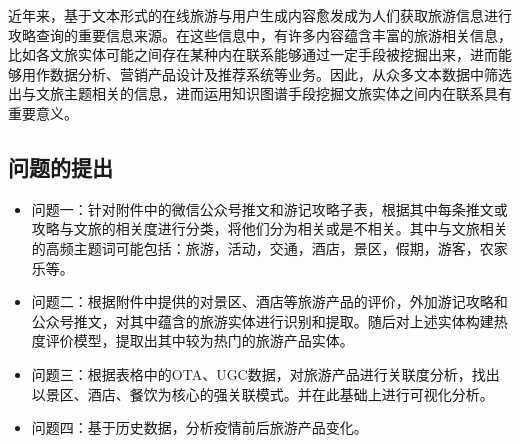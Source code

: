 \documentclass[bwprint]{gmcmthesis}
\begin{document}
近年来，基于文本形式的在线旅游与用户生成内容愈发成为人们获取旅游信息进行攻略查询的重要信息来源。在这些信息中，有许多内容蕴含丰富的旅游相关信息，比如各文旅实体可能之间存在某种内在联系能够通过一定手段被挖掘出来，进而能够用作数据分析、营销产品设计及推荐系统等业务。因此，从众多文本数据中筛选出与文旅主题相关的信息，进而运用知识图谱手段挖掘文旅实体之间内在联系具有重要意义。

\subsection{问题的提出}

\begin{itemize}
	\item 问题一：针对附件中的微信公众号推文和游记攻略子表，根据其中每条推文或攻略与文旅的相关度进行分类，将他们分为相关或是不相关。其中与文旅相关的高频主题词可能包括：旅游，活动，交通，酒店，景区，假期，游客，农家乐等。
 
	\item 问题二：根据附件中提供的对景区、酒店等旅游产品的评价，外加游记攻略和公众号推文，对其中蕴含的旅游实体进行识别和提取。随后对上述实体构建热度评价模型，提取出其中较为热门的旅游产品实体。
 
	\item 问题三：根据表格中的OTA、UGC数据，对旅游产品进行关联度分析，找出以景区、酒店、餐饮为核心的强关联模式。并在此基础上进行可视化分析。
 
	\item 问题四：基于历史数据，分析疫情前后旅游产品变化。
\end{itemize}




\end{document}
